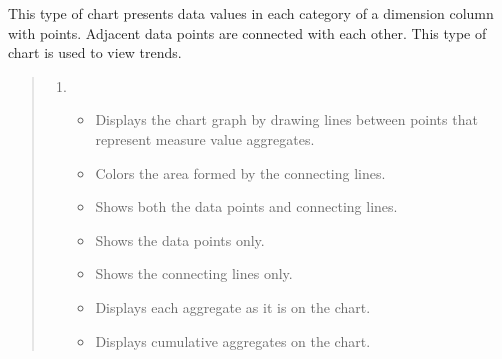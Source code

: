 \documentclass[letterpaper,10pt,english]{sphinxmanual}
\begin{document}
This type of chart presents data values in each category of a dimension column with points. Adjacent data points are connected with each other. This type of chart is used to view trends.
\begin{quote}

\begin{figure}[H]
\centering

\noindent{}
\end{figure}
\begin{enumerate}
\def\theenumi{\arabic{enumi}}
\def\labelenumi{\theenumi .}
\makeatletter\def\p@enumii{\p@enumi \theenumi .}\makeatother
\item {} 
\begin{itemize}
\item {} 
 Displays the chart graph by drawing lines between points that represent measure value aggregates.

\item {} 
 Colors the area formed by the connecting lines.

\item {} 
 Shows both the data points and connecting lines.

\item {} 
 Shows the data points only.

\item {} 
 Shows the connecting lines only.

\item {} 
 Displays each aggregate as it is on the chart.

\item {} 
 Displays cumulative aggregates on the chart.

\end{itemize}

\end{enumerate}
\end{quote}

\end{document}
